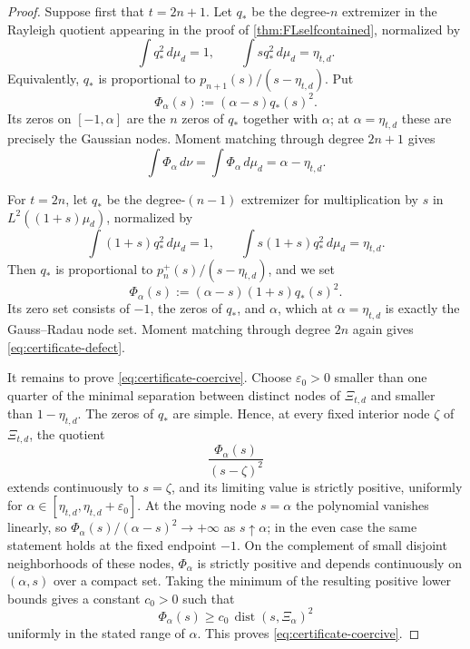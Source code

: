 \documentclass[11pt]{amsart}
\theoremstyle{definition}
\theoremstyle{remark}
\begin{document}
\begin{proof}
Suppose first that $t=2n+1$.  Let $q_*$ be the degree-$n$ extremizer in the Rayleigh quotient appearing in the proof of \cref{thm:FLselfcontained}, normalized by
\[
 \int q_*^2\,d\mu_d=1,
 \qquad
 \int s q_*^2\,d\mu_d=\eta_{t,d}.
\]
Equivalently, $q_*$ is proportional to $p_{n+1}(s)/(s-\eta_{t,d})$.  Put
\[
 \Phi_\alpha(s):=(\alpha-s)q_*(s)^2.
\]
Its zeros on $[-1,\alpha]$ are the $n$ zeros of $q_*$ together with $\alpha$; at $\alpha=\eta_{t,d}$ these are precisely the Gaussian nodes.  Moment matching through degree $2n+1$ gives
\[
 \int\Phi_\alpha\,d\nu
 =\int\Phi_\alpha\,d\mu_d
 =\alpha-\eta_{t,d}.
\]

For $t=2n$, let $q_*$ be the degree-$(n-1)$ extremizer for multiplication by $s$ in $L^2((1+s)\mu_d)$, normalized by
\[
 \int(1+s)q_*^2\,d\mu_d=1,
 \qquad
 \int s(1+s)q_*^2\,d\mu_d=\eta_{t,d}.
\]
Then $q_*$ is proportional to $p_n^+(s)/(s-\eta_{t,d})$, and we set
\[
 \Phi_\alpha(s):=(\alpha-s)(1+s)q_*(s)^2.
\]
Its zero set consists of $-1$, the zeros of $q_*$, and $\alpha$, which at $\alpha=\eta_{t,d}$ is exactly the Gauss--Radau node set.  Moment matching through degree $2n$ again gives \eqref{eq:certificate-defect}.

It remains to prove \eqref{eq:certificate-coercive}.  Choose $\varepsilon_0>0$ smaller than one quarter of the minimal separation between distinct nodes of $\Xi_{t,d}$ and smaller than $1-\eta_{t,d}$.  The zeros of $q_*$ are simple.  Hence, at every fixed interior node $\zeta$ of $\Xi_{t,d}$, the quotient
\[
 \frac{\Phi_\alpha(s)}{(s-\zeta)^2}
\]
extends continuously to $s=\zeta$, and its limiting value is strictly positive, uniformly for $\alpha\in[\eta_{t,d},\eta_{t,d}+\varepsilon_0]$.  At the moving node $s=\alpha$ the polynomial vanishes linearly, so $\Phi_\alpha(s)/(\alpha-s)^2\to+\infty$ as $s\uparrow\alpha$; in the even case the same statement holds at the fixed endpoint $-1$.  On the complement of small disjoint neighborhoods of these nodes, $\Phi_\alpha$ is strictly positive and depends continuously on $(\alpha,s)$ over a compact set.  Taking the minimum of the resulting positive lower bounds gives a constant $c_0>0$ such that
\[
 \Phi_\alpha(s)\ge c_0\,\operatorname{dist}(s,\Xi_\alpha)^2
\]
uniformly in the stated range of $\alpha$.  This proves \eqref{eq:certificate-coercive}.  \qedhere
\end{proof}
\end{document}
